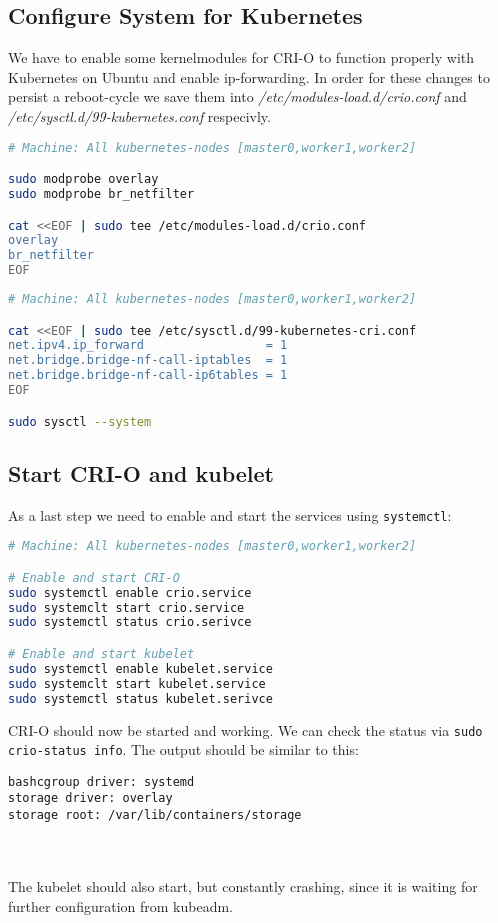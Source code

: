 \subsection{Configure System for Kubernetes}

We have to enable some kernelmodules for CRI-O to function properly with Kubernetes on Ubuntu and enable ip-forwarding. In order for these changes to persist a reboot-cycle we save them into \textit{/etc/modules-load.d/crio.conf} and \textit{/etc/sysctl.d/99-kubernetes.conf} respecivly.

\begin{lstlisting}[language=bash,caption=Enable kernelmodules] 
# Machine: All kubernetes-nodes [master0,worker1,worker2]

sudo modprobe overlay
sudo modprobe br_netfilter

cat <<EOF | sudo tee /etc/modules-load.d/crio.conf
overlay
br_netfilter
EOF
\end{lstlisting}

\begin{lstlisting}[language=bash,caption=Enable IP-Forwarding] 
# Machine: All kubernetes-nodes [master0,worker1,worker2]

cat <<EOF | sudo tee /etc/sysctl.d/99-kubernetes-cri.conf
net.ipv4.ip_forward                 = 1
net.bridge.bridge-nf-call-iptables  = 1
net.bridge.bridge-nf-call-ip6tables = 1
EOF

sudo sysctl --system
\end{lstlisting}

\subsection{Start CRI-O and kubelet}
As a last step we need to enable and start the services using \texttt{systemctl}:

\begin{lstlisting}[language=bash,caption=Starting CRI-O and kubelet services] 
# Machine: All kubernetes-nodes [master0,worker1,worker2]

# Enable and start CRI-O
sudo systemctl enable crio.service
sudo systemclt start crio.service
sudo systemctl status crio.serivce

# Enable and start kubelet
sudo systemctl enable kubelet.service
sudo systemclt start kubelet.service
sudo systemctl status kubelet.serivce
\end{lstlisting}
CRI-O should now be started and working. We can check the status via \texttt{sudo crio-status info}. The output should be similar to this:
\begin{lstlisting}
bashcgroup driver: systemd
storage driver: overlay
storage root: /var/lib/containers/storage
\end{lstlisting}
\\\\
The kubelet should also start, but constantly crashing, since it is waiting for further configuration from kubeadm.

